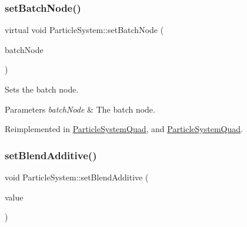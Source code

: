 \mbox{\label{classParticleSystem_a25d4f3b0af694369293e586cfde4d470}} 
\subsubsection{\texorpdfstring{set\+Batch\+Node()}{setBatchNode()}\hspace{0.1cm}{\footnotesize\ttfamily [2/2]}}
{\footnotesize\ttfamily virtual void Particle\+System\+::set\+Batch\+Node (\begin{DoxyParamCaption}\item[{\hyperlink{classParticleBatchNode}{Particle\+Batch\+Node} $\ast$}]{batch\+Node }\end{DoxyParamCaption})\hspace{0.3cm}{\ttfamily [virtual]}}

Sets the batch node.


\begin{DoxyParams}{Parameters}
{\em batch\+Node} & The batch node. \\
\hline
\end{DoxyParams}


Reimplemented in \hyperlink{classParticleSystemQuad_aebafe7b796960463ca8c16358c8d819f}{Particle\+System\+Quad}, and \hyperlink{classParticleSystemQuad_a0609c28ee1074bae27e971af5693a37d}{Particle\+System\+Quad}.

\mbox{\label{classParticleSystem_abc8de72bc70a7c741c493607998ea2be}} 
\subsubsection{\texorpdfstring{set\+Blend\+Additive()}{setBlendAdditive()}\hspace{0.1cm}{\footnotesize\ttfamily [1/2]}}
{\footnotesize\ttfamily void Particle\+System\+::set\+Blend\+Additive (\begin{DoxyParamCaption}\item[{bool}]{value }\end{DoxyParamCaption})\hspace{0.3cm}{\ttfamily [virtual]}}


